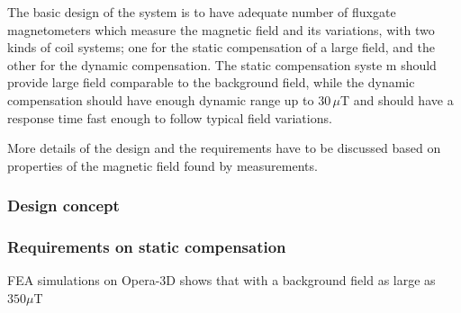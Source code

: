     
    The basic design of the system is to have adequate number of fluxgate magnetometers which measure the magnetic  field and its variations, with two kinds of coil systems; one for the  static compensation of a large field, and the other for the dynamic compensation. The static compensation syste m should provide large field comparable to the background field, while the dynamic compensation should have enough dynamic range up to $30\,\mu$T and should have a response time fast enough to follow typical field variations.
    
    More details of the design and the requirements have to be discussed based on properties of the magnetic field found by measurements. 

\subsubsection{Design concept}

\subsubsection{Requirements on static compensation}
FEA simulations on Opera-3D shows that with a background field as large as  $350\mu$T






